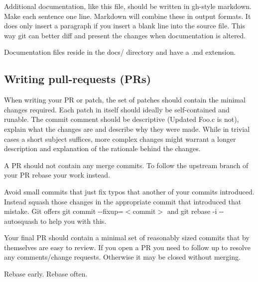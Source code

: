 Additional documentation, like this file, should be written in gh-\/style markdown. Make each sentence one line. Markdown will combine these in output formats. It does only insert a paragraph if you insert a blank line into the source file. This way git can better diff and present the changes when documentation is altered.

Documentation files reside in the {\ttfamily docs/} directory and have a {\ttfamily .md} extension.

\subsection*{Writing pull-\/requests (P\+Rs) }

When writing your PR or patch, the set of patches should contain the minimal changes required. Each patch in itself should ideally be self-\/contained and runable. The commit comment should be descriptive ({\ttfamily Updated Foo.\+c} is not), explain what the changes are and describe why they were made. While in trivial cases a short subject suffices, more complex changes might warrant a longer description and explanation of the rationale behind the changes.

A PR should not contain any merge commits. To follow the upstream branch of your PR rebase your work instead.

Avoid small commits that just fix typos that another of your commits introduced. Instead squash those changes in the appropriate commit that introduced that mistake. Git offers {\ttfamily git commit -\/-\/fixup=$<$commit$>$} and {\ttfamily git rebase -\/i -\/-\/autosquash} to help you with this.

Your final PR should contain a minimal set of reasonably sized commits that by themselves are easy to review. If you open a PR you need to follow up to resolve any comments/change requests. Otherwise it may be closed without merging.

Rebase early. Rebase often. 